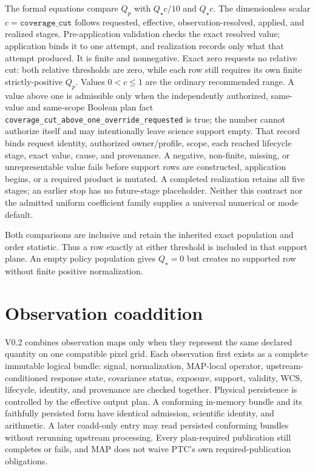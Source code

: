 \documentclass[10pt]{article}
\newcommand{\code}[1]{\nolinkurl{#1}}
\begin{document}
The formal equations compare \(Q_p\) with \(Q_\star c/10\) and \(Q_\star c\).
The dimensionless scalar \(c=\texttt{coverage\_cut}\) follows requested,
effective, observation-resolved, applied, and realized stages. Pre-application
validation checks the exact resolved value; application binds it to one
attempt, and realization records only what that attempt produced. It is finite
and nonnegative. Exact zero requests no relative cut: both relative thresholds are
zero, while each row still requires its own finite strictly-positive \(Q_p\).
Values \(0<c\le1\) are the ordinary recommended range. A value above one is
admissible only when the independently authorized, same-value and same-scope
Boolean plan fact \code{coverage_cut_above_one_override_requested} is true; the
number cannot authorize itself and may intentionally leave science support
empty. That record binds request identity, authorized owner/profile, scope,
each reached lifecycle stage, exact value, cause, and provenance. A negative,
non-finite, missing, or unrepresentable value fails before support rows are
constructed, application begins, or a required product is mutated. A completed
realization retains all five stages; an earlier stop has no future-stage
placeholder. Neither this contract nor the admitted uniform
coefficient family supplies a universal numerical or mode default.

Both comparisons are inclusive and retain the inherited exact population and
order statistic. Thus a row exactly at either threshold is included in that
support plane. An empty policy population gives \(Q_\star=0\) but creates no
supported row without finite positive normalization.

\clearpage
\section{Observation coaddition}\label{sec:coadd}
V0.2 combines observation maps only when they represent the same declared
quantity on one compatible pixel grid. Each observation first exists as a
complete immutable logical bundle: signal, normalization, MAP-local operator,
upstream-conditioned response state, covariance status, exposure, support,
validity, WCS, lifecycle, identity, and provenance are checked together.
Physical persistence is controlled by the effective output plan. A conforming
in-memory bundle and its faithfully persisted form have identical admission,
scientific identity, and arithmetic. A later coadd-only entry may read
persisted conforming bundles without rerunning upstream processing. Every
plan-required publication still completes or fails, and MAP does not waive
PTC's own required-publication obligations.
\end{document}
